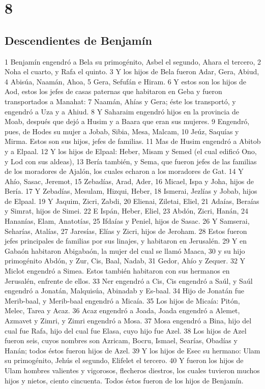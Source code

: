 \chapter{8}

\section*{Descendientes de Benjamín}


1 Benjamín engendró a Bela su primogénito, Asbel el segundo, Ahara el tercero,
2 Noha el cuarto, y Rafa el quinto.
3 Y los hijos de Bela fueron Adar, Gera, Abiud,
4 Abisúa, Naamán, Ahoa,
5 Gera, Sefufán e Hiram. 
6 Y estos son los hijos de Aod, estos los jefes de casas paternas que habitaron en Geba y fueron transportados a Manahat:
7 Naamán, Ahías y Gera; éste los transportó, y engendró a Uza y a Ahiud.
8 Y Saharaim engendró hijos en la provincia de Moab, después que dejó a Husim y a Baara que eran sus mujeres.
9 Engendró, pues, de Hodes su mujer a Jobab, Sibia, Mesa, Malcam,
10 Jeúz, Saquías y Mirma. Estos son sus hijos, jefes de familias.
11 Mas de Husim engendró a Abitob y a Elpaal.
12 Y los hijos de Elpaal: Heber, Misam y Semed (el cual edificó Ono, y Lod con sus aldeas),
13 Bería también, y Sema, que fueron jefes de las familias de los moradores de Ajalón, los cuales echaron a los moradores de Gat.
14 Y Ahío, Sasac, Jeremot,
15 Zebadías, Arad, Ader,
16 Micael, Ispa y Joha, hijos de Bería.
17 Y Zebadías, Mesulam, Hizqui, Heber,
18 Ismerai, Jezlías y Jobab, hijos de Elpaal.
19 Y Jaquim, Zicri, Zabdi,
20 Elienai, Ziletai, Eliel,
21 Adaías, Beraías y Simrat, hijos de Simei.
22 E Ispán, Heber, Eliel,
23 Abdón, Zicri, Hanán,
24 Hananías, Elam, Anatotías,
25 Ifdaías y Peniel, hijos de Sasac.
26 Y Samserai, Seharías, Atalías,
27 Jaresías, Elías y Zicri, hijos de Jeroham.
28 Estos fueron jefes principales de familias por sus linajes, y habitaron en Jerusalén.
29 Y en Gabaón habitaron Abigabaón, la mujer del cual se llamó Maaca,
30 y su hijo primogénito Abdón, y Zur, Cis, Baal, Nadab,
31 Gedor, Ahío y Zequer.
32 Y Miclot engendró a Simea. Estos también habitaron con sus hermanos en Jerusalén, enfrente de ellos.
33 Ner engendró a Cis, Cis engendró a Saúl, y Saúl engendró a Jonatán, Malquisúa, Abinadab y Es-baal.
34 Hijo de Jonatán fue Merib-baal, y Merib-baal engendró a Micaía.
35 Los hijos de Micaía: Pitón, Melec, Tarea y Acaz.
36 Acaz engendró a Joada, Joada engendró a Alemet, Azmavet y Zimri, y Zimri engendró a Mosa.
37 Mosa engendró a Bina, hijo del cual fue Rafa, hijo del cual fue Elasa, cuyo hijo fue Azel.
38 Los hijos de Azel fueron seis, cuyos nombres son Azricam, Bocru, Ismael, Searías, Obadías y Hanán; todos éstos fueron hijos de Azel.
39 Y los hijos de Esec su hermano: Ulam su primogénito, Jehús el segundo, Elifelet el tercero.
40 Y fueron los hijos de Ulam hombres valientes y vigorosos, flecheros diestros, los cuales tuvieron muchos hijos y nietos, ciento cincuenta. Todos éstos fueron de los hijos de Benjamín.


